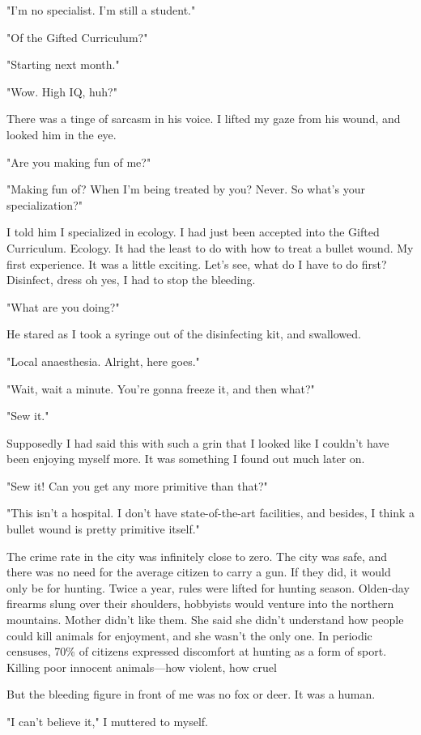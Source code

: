"I'm no specialist. I'm still a student."

"Of the Gifted Curriculum?"

"Starting next month."

"Wow. High IQ, huh?"

There was a tinge of sarcasm in his voice. I lifted my gaze from his
wound, and looked him in the eye.

"Are you making fun of me?"

"Making fun of? When I'm being treated by you? Never. So what's your
specialization?"

I told him I specialized in ecology. I had just been accepted into the
Gifted Curriculum. Ecology. It had the least to do with how to treat a
bullet wound. My first experience. It was a little exciting. Let's see,
what do I have to do first? Disinfect, dress \el oh yes, I had to stop
the bleeding.

"What are you doing?"

He stared as I took a syringe out of the disinfecting kit, and
swallowed.

"Local anaesthesia. Alright, here goes."

"Wait, wait a minute. You're gonna freeze it, and then what?"

"Sew it."

Supposedly I had said this with such a grin that I looked like I
couldn't have been enjoying myself more. It was something I found out
much later on.

"Sew it! Can you get any more primitive than that?"

"This isn't a hospital. I don't have state-of-the-art facilities, and
besides, I think a bullet wound is pretty primitive itself."

The crime rate in the city was infinitely close to zero. The city was
safe, and there was no need for the average citizen to carry a gun. If
they did, it would only be for hunting. Twice a year, rules were lifted
for hunting season. Olden-day firearms slung over their shoulders,
hobbyists would venture into the northern mountains. Mother didn't like
them. She said she didn't understand how people could kill animals for
enjoyment, and she wasn't the only one. In periodic censuses, 70\% of
citizens expressed discomfort at hunting as a form of sport. Killing
poor innocent animals---how violent, how cruel\el 

But the bleeding figure in front of me was no fox or deer. It was a
human.

"I can't believe it," I muttered to myself.


